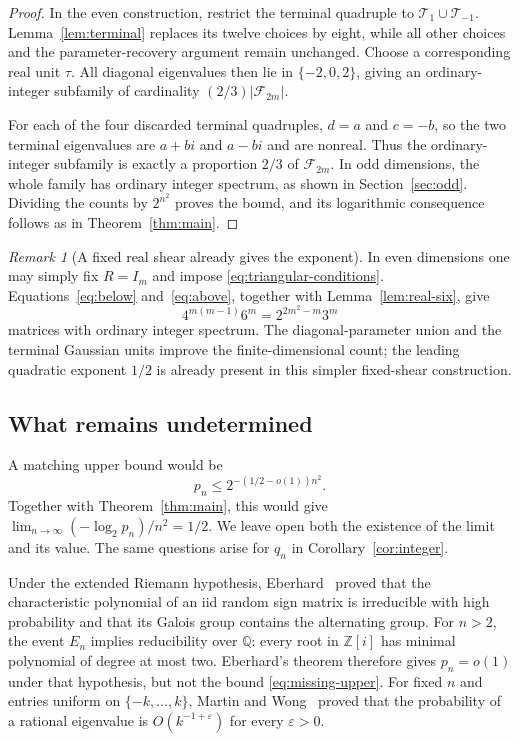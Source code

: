 \documentclass[11pt]{amsart}
\theoremstyle{definition}
\theoremstyle{remark}
\newtheorem{remark}[theorem]{Remark}
\newcommand{\Z}{\mathbb Z}
\newcommand{\Q}{\mathbb Q}
\newcommand{\F}{\mathcal F}
\numberwithin{equation}{section}
\begin{document}
\begin{proof}
In the even construction, restrict the terminal quadruple to $\mathcal T_1\cup\mathcal T_{-1}$. Lemma~\ref{lem:terminal} replaces its twelve choices by eight, while all other choices and the parameter-recovery argument remain unchanged. Choose a corresponding real unit $\tau$. All diagonal eigenvalues then lie in $\{-2,0,2\}$, giving an ordinary-integer subfamily of cardinality $(2/3)|\F_{2m}|$.

For each of the four discarded terminal quadruples, $d=a$ and $c=-b$, so the two terminal eigenvalues are $a+bi$ and $a-bi$ and are nonreal. Thus the ordinary-integer subfamily is exactly a proportion $2/3$ of $\F_{2m}$. In odd dimensions, the whole family has ordinary integer spectrum, as shown in Section~\ref{sec:odd}. Dividing the counts by $2^{n^2}$ proves the bound, and its logarithmic consequence follows as in Theorem~\ref{thm:main}.
\end{proof}

\begin{remark}[A fixed real shear already gives the exponent]\label{rem:fixed-shear}
In even dimensions one may simply fix $R=I_m$ and impose \eqref{eq:triangular-conditions}. Equations~\eqref{eq:below} and~\eqref{eq:above}, together with Lemma~\ref{lem:real-six}, give
\[
 4^{m(m-1)}6^m=2^{2m^2-m}3^m
\]
matrices with ordinary integer spectrum. The diagonal-parameter union and the terminal Gaussian units improve the finite-dimensional count; the leading quadratic exponent $1/2$ is already present in this simpler fixed-shear construction.
\end{remark}

\subsection{What remains undetermined}

A matching upper bound would be
\begin{equation}\label{eq:missing-upper}
 p_n\leq2^{-(1/2-o(1))n^2}.
\end{equation}
Together with Theorem~\ref{thm:main}, this would give $\lim_{n\to\infty}(-\log_2p_n)/n^2=1/2$. We leave open both the existence of the limit and its value. The same questions arise for $q_n$ in Corollary~\ref{cor:integer}.

Under the extended Riemann hypothesis, Eberhard~\cite{Eberhard2022} proved that the characteristic polynomial of an iid random sign matrix is irreducible with high probability and that its Galois group contains the alternating group. For $n>2$, the event $E_n$ implies reducibility over $\Q$: every root in $\Z[i]$ has minimal polynomial of degree at most two. Eberhard's theorem therefore gives $p_n=o(1)$ under that hypothesis, but not the bound \eqref{eq:missing-upper}. For fixed $n$ and entries uniform on $\{-k,\dots,k\}$, Martin and Wong~\cite{MW09} proved that the probability of a rational eigenvalue is $O(k^{-1+\varepsilon})$ for every $\varepsilon>0$.
\end{document}
